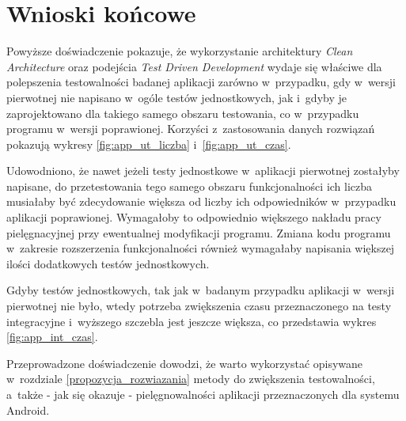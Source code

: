 \newpage
\section{Wnioski końcowe}
Powyższe doświadczenie pokazuje, że wykorzystanie architektury \textit{Clean Architecture} oraz podejścia \textit{Test Driven Development} wydaje się właściwe dla polepszenia testowalności badanej aplikacji zarówno w~przypadku, gdy w~wersji pierwotnej nie napisano w~ogóle testów jednostkowych, jak i~gdyby je zaprojektowano dla takiego samego obszaru testowania, co w~przypadku programu w~wersji poprawionej. Korzyści z~zastosowania danych rozwiązań pokazują wykresy \ref{fig:app_ut_liczba} i~\ref{fig:app_ut_czas}.

Udowodniono, że nawet jeżeli testy jednostkowe w~aplikacji pierwotnej zostałyby napisane, do przetestowania tego samego obszaru funkcjonalności ich liczba musiałaby być zdecydowanie większa od liczby ich odpowiedników w~przypadku aplikacji poprawionej. Wymagałoby to odpowiednio większego nakładu pracy pielęgnacyjnej przy ewentualnej modyfikacji programu. Zmiana kodu programu w~zakresie rozszerzenia funkcjonalności również wymagałaby napisania większej ilości dodatkowych testów jednostkowych.

Gdyby testów jednostkowych, tak jak w~badanym przypadku aplikacji w~wersji pierwotnej nie było, wtedy potrzeba zwiększenia czasu przeznaczonego na testy integracyjne i~wyższego szczebla jest jeszcze większa, co przedstawia wykres \ref{fig:app_int_czas}.

Przeprowadzone doświadczenie dowodzi, że warto wykorzystać opisywane w~rozdziale \ref{propozycja_rozwiazania} metody do zwiększenia testowalności, a~także - jak się okazuje - pielęgnowalności aplikacji przeznaczonych dla systemu Android. 